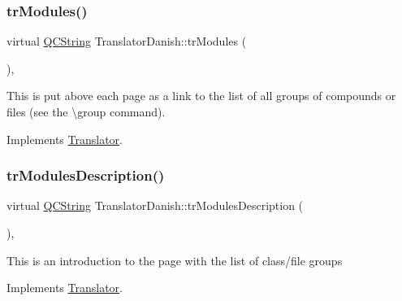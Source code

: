 \mbox{\label{class_translator_danish_a860facaa53d81296134b2d14dd1cbb95}} 
\subsubsection{\texorpdfstring{trModules()}{trModules()}}
{\footnotesize\ttfamily virtual \mbox{\hyperlink{class_q_c_string}{Q\+C\+String}} Translator\+Danish\+::tr\+Modules (\begin{DoxyParamCaption}{ }\end{DoxyParamCaption})\hspace{0.3cm}{\ttfamily [inline]}, {\ttfamily [virtual]}}

This is put above each page as a link to the list of all groups of compounds or files (see the \textbackslash{}group command). 

Implements \mbox{\hyperlink{class_translator}{Translator}}.

\mbox{\label{class_translator_danish_ab4701fe2a5a9992255a074c848f39469}} 
\subsubsection{\texorpdfstring{trModulesDescription()}{trModulesDescription()}}
{\footnotesize\ttfamily virtual \mbox{\hyperlink{class_q_c_string}{Q\+C\+String}} Translator\+Danish\+::tr\+Modules\+Description (\begin{DoxyParamCaption}{ }\end{DoxyParamCaption})\hspace{0.3cm}{\ttfamily [inline]}, {\ttfamily [virtual]}}

This is an introduction to the page with the list of class/file groups 

Implements \mbox{\hyperlink{class_translator}{Translator}}.

\mbox{\label{class_translator_danish_a60f4695411b83cb469b4ea92f69f136d}} 
